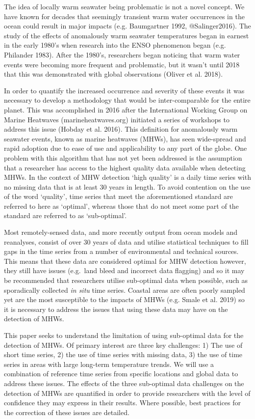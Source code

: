 \documentclass[]{article}
\begin{document}
The idea of locally warm seawater being problematic is not a novel
concept. We have known for decades that seemingly transient warm water
occurrences in the ocean could result in major impacts (e.g. Baumgartner
1992, @Salinger2016). The study of the effects of anomalously warm
seawater temperatures began in earnest in the early 1980's when research
into the ENSO phenomenon began (e.g. Philander 1983). After the 1980's,
researchers began noticing that warm water events were becoming more
frequent and problematic, but it wasn't until 2018 that this was
demonstrated with global observations (Oliver et al. 2018).

In order to quantify the increased occurrence and severity of these
events it was necessary to develop a methodology that would be
inter-comparable for the entire planet. This was accomplished in 2016
after the International Working Group on Marine Heatwaves
(marineheatwaves.org) initiated a series of workshops to address this
issue (Hobday et al. 2016). This definition for anomalously warm
seawater events, known as marine heatwaves (MHWs), has seen wide-spread
and rapid adoption due to ease of use and applicability to any part of
the globe. One problem with this algorithm that has not yet been
addressed is the assumption that a researcher has access to the highest
quality data available when detecting MHWs. In the context of MHW
detection `high quality' is a daily time series with no missing data
that is at least 30 years in length. To avoid contention on the use of
the word `quality', time series that meet the aforementioned standard
are referred to here as `optimal', whereas those that do not meet some
part of the standard are referred to as `sub-optimal'.

Most remotely-sensed data, and more recently output from ocean models
and reanalyses, consist of over 30 years of data and utilise statistical
techniques to fill gaps in the time series from a number of
environmental and technical sources. This means that these data are
considered optimal for MHW detection however, they still have issues
(e.g.~land bleed and incorrect data flagging) and so it may be
recommended that researchers utilise sub-optimal data when possible,
such as sporadically collected \emph{in situ} time series. Coastal areas
are often poorly sampled yet are the most susceptible to the impacts of
MHWs (e.g. Smale et al. 2019) so it is necessary to address the issues
that using these data may have on the detection of MHWs.

This paper seeks to understand the limitation of using sub-optimal data
for the detection of MHWs. Of primary interest are three key challenges:
1) The use of short time series, 2) the use of time series with missing
data, 3) the use of time series in areas with large long-term
temperature trends. We will use a combination of reference time series
from specific locations and global data to address these issues. The
effects of the three sub-optimal data challenges on the detection of
MHWs are quantified in order to provide researchers with the level of
confidence they may express in their results. Where possible, best
practices for the correction of these issues are detailed.
\end{document}
